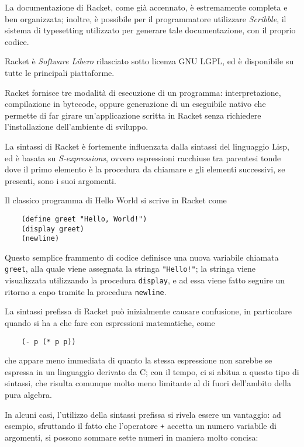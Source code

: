La documentazione di Racket, come gi\`a accennato, \`e estremamente
completa e ben organizzata; inoltre, \`e possibile per il programmatore
utilizzare \emph{Scribble}, il sistema di typesetting utilizzato per
generare tale documentazione, con il proprio codice.

Racket \`e \emph{Software Libero} rilasciato sotto licenza GNU LGPL, ed
\`e disponibile su tutte le principali piattaforme.

Racket fornisce tre modalit\`a di esecuzione di un programma:
interpretazione, compilazione in bytecode, oppure generazione di un
eseguibile nativo che permette di far girare un'applicazione scritta in
Racket senza richiedere l'installazione dell'ambiente di sviluppo.

La sintassi di Racket \`e fortemente influenzata dalla sintassi del
linguaggio Lisp, ed \`e basata su \emph{S-expressions}, ovvero espressioni
racchiuse tra parentesi tonde dove il primo elemento \`e la procedura
da chiamare e gli elementi successivi, se presenti, sono i suoi
argomenti.

Il classico programma di Hello World si scrive in Racket come

\begin{lstlisting}
    (define greet "Hello, World!")
    (display greet)
    (newline)
\end{lstlisting}

Questo semplice frammento di codice definisce una nuova variabile
chiamata \lstinline{greet}, alla quale viene assegnata la stringa
\lstinline{"Hello!"}; la stringa viene visualizzata utilizzando la
procedura \lstinline{display}, e ad essa viene fatto seguire un
ritorno a capo tramite la procedura \lstinline{newline}.

La sintassi prefissa di Racket pu\`o inizialmente causare confusione,
in particolare quando si ha a che fare con espressioni matematiche,
come

\begin{lstlisting}
    (- p (* p p))
\end{lstlisting}

che appare meno immediata di quanto la stessa espressione non sarebbe
se espressa in un linguaggio derivato da C; con il tempo, ci si abitua
a questo tipo di sintassi, che risulta comunque molto meno limitante
al di fuori dell'ambito della pura algebra.

In alcuni casi, l'utilizzo della sintassi prefissa si rivela essere un
vantaggio: ad esempio, sfruttando il fatto che l'operatore \lstinline{+}
accetta un numero variabile di argomenti, si possono sommare sette numeri
in maniera molto concisa:

